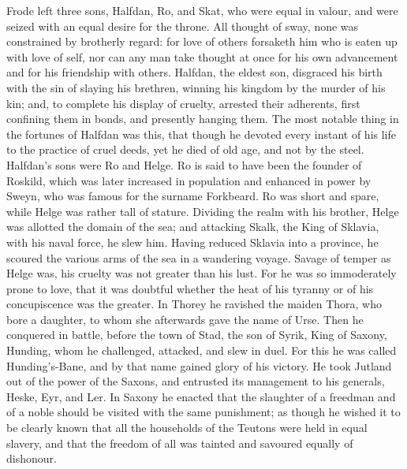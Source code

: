 \documentclass[10pt,a4paper]{report}
\begin{document}
Frode left three sons, Halfdan, Ro, and Skat, who were equal in valour, and were seized with an equal desire for the throne. All thought of sway, none was constrained by brotherly regard: for love of others forsaketh him who is eaten up with love of self, nor can any man take thought at once for his own advancement and for his friendship with others. Halfdan, the eldest son, disgraced his birth with the sin of slaying his brethren, winning his kingdom by the murder of his kin; and, to complete his display of cruelty, arrested their adherents, first confining them in bonds, and presently hanging them. The most notable thing in the fortunes of Halfdan was this, that though he devoted every instant of his life to the practice of cruel deeds, yet he died of old age, and not by the steel.\\

Halfdan's sons were Ro and Helge. Ro is said to have been the founder of Roskild, which was later increased in population and enhanced in power by Sweyn, who was famous for the surname Forkbeard. Ro was short and spare, while Helge was rather tall of stature. Dividing the realm with his brother, Helge was allotted the domain of the sea; and attacking Skalk, the King of Sklavia, with his naval force, he slew him. Having reduced Sklavia into a province, he scoured the various arms of the sea in a wandering voyage. Savage of temper as Helge was, his cruelty was not greater than his lust. For he was so immoderately prone to love, that it was doubtful whether the heat of his tyranny or of his concupiscence was the greater. In Thorey he ravished the maiden Thora, who bore a daughter, to whom she afterwards gave the name of Urse. Then he conquered in battle, before the town of Stad, the son of Syrik, King of Saxony, Hunding, whom he challenged, attacked, and slew in duel. For this he was called Hunding's-Bane, and by that name gained glory of his victory. He took Jutland out of the power of the Saxons, and entrusted its management to his generals, Heske, Eyr, and Ler. In Saxony he enacted that the slaughter of a freedman and of a noble should be visited with the same punishment; as though he wished it to be clearly known that all the households of the Teutons were held in equal slavery, and that the freedom of all was tainted and savoured equally of dishonour.\\
\end{document}
